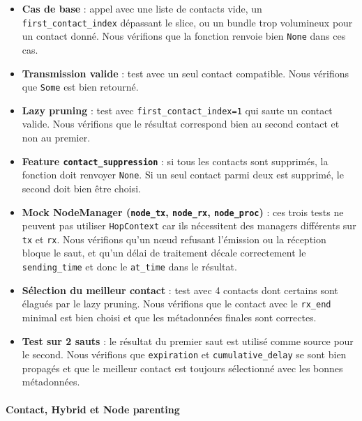 \documentclass{article}
\begin{document}
\begin{itemize}
    \item \textbf{Cas de base} : appel avec une liste de contacts vide, un \texttt{first\_contact\_index} dépassant le slice, ou un bundle trop volumineux pour un contact donné. Nous vérifions que la fonction renvoie bien \texttt{None} dans ces cas.

    \item \textbf{Transmission valide} : test avec un seul contact compatible. Nous vérifions que \texttt{Some} est bien retourné.

    \item \textbf{Lazy pruning} : test avec \texttt{first\_contact\_index=1} qui saute un contact valide. Nous vérifions que le résultat correspond bien au second contact et non au premier.

    \item \textbf{Feature \texttt{contact\_suppression}} : si tous les contacts sont supprimés, la fonction doit renvoyer \texttt{None}. Si un seul contact parmi deux est supprimé, le second doit bien être choisi.

    \item \textbf{Mock NodeManager (\texttt{node\_tx}, \texttt{node\_rx}, \texttt{node\_proc})} : ces trois tests ne peuvent pas utiliser \texttt{HopContext} car ils nécessitent des managers différents sur \texttt{tx} et \texttt{rx}. Nous vérifions qu'un nœud refusant l'émission ou la réception bloque le saut, et qu'un délai de traitement décale correctement le \texttt{sending\_time} et donc le \texttt{at\_time} dans le résultat.

    \item \textbf{Sélection du meilleur contact} : test avec 4 contacts dont certains sont élagués par le lazy pruning. Nous vérifions que le contact avec le \texttt{rx\_end} minimal est bien choisi et que les métadonnées finales sont correctes.

    \item \textbf{Test sur 2 sauts} : le résultat du premier saut est utilisé comme source pour le second. Nous vérifions que \texttt{expiration} et \texttt{cumulative\_delay} se sont bien propagés et que le meilleur contact est toujours sélectionné avec les bonnes métadonnées.
\end{itemize}

\newpage
\paragraph{Contact, Hybrid et Node parenting}~\\
\end{document}
